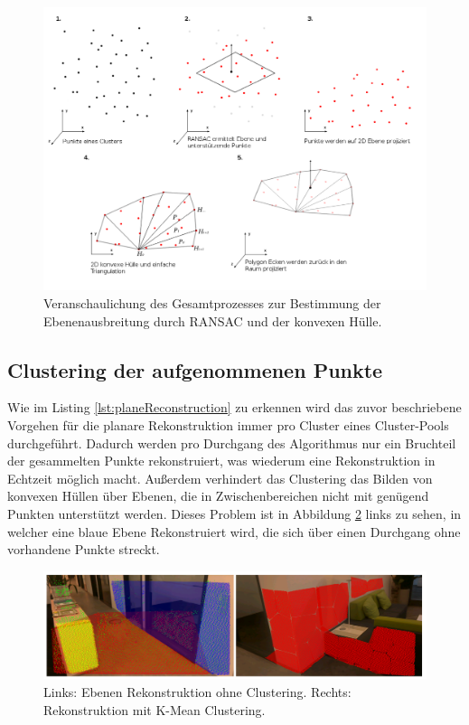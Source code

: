 \begin{figure}[h]
  \centering
	\includegraphics[width=1.1\textwidth]{content/images/methods/polygon-process.png} 
  \caption{Veranschaulichung des Gesamtprozesses zur Bestimmung der Ebenenausbreitung durch RANSAC und der konvexen Hülle.}
  \label{fig:polygon-process}
\end{figure}

\newpage

\subsection{Clustering der aufgenommenen Punkte} \label{sec:cluster}

Wie im Listing \ref{lst:planeReconstruction} zu erkennen wird das zuvor beschriebene Vorgehen für die planare Rekonstruktion immer pro Cluster eines Cluster-Pools durchgeführt. Dadurch werden pro Durchgang des Algorithmus nur ein Bruchteil der gesammelten Punkte rekonstruiert, was wiederum eine Rekonstruktion in Echtzeit möglich macht. Außerdem verhindert das Clustering das Bilden von konvexen Hüllen über Ebenen, die in Zwischenbereichen nicht mit genügend Punkten unterstützt werden. Dieses Problem ist in Abbildung \ref{fig:clustering} links zu sehen, in welcher eine blaue Ebene Rekonstruiert wird, die sich über einen Durchgang ohne vorhandene Punkte streckt.

\begin{figure}[h]
  \centering
	\includegraphics[width=1.0\textwidth]{content/images/methods/clustering.png} 
  \caption{Links: Ebenen Rekonstruktion ohne Clustering. Rechts: Rekonstruktion mit K-Mean Clustering.}
  \label{fig:clustering}
\end{figure}


